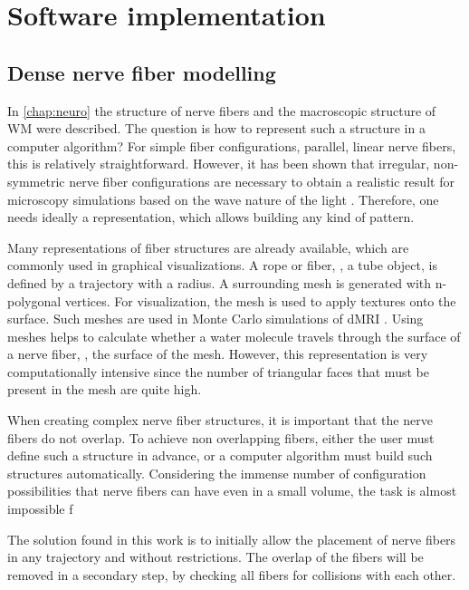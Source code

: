 \newpage\null\thispagestyle{empty}\newpage
\clearpage{\thispagestyle{empty}\cleardoublepage}
\part{Software implementation}
\parttoc
% 
% 
% 
\setcounter{chapter}{4}
\chapter{Dense nerve fiber modelling}
\label{chap:sof:modelling}
% 
In \cref{chap:neuro} the structure of nerve fibers and the macroscopic structure of \ac{WM} were described.
The question is how to represent such a structure in a computer algorithm?
For simple fiber configurations, \eg{} parallel, linear nerve fibers, this is relatively straightforward.
However, it has been shown that irregular, non-symmetric nerve fiber configurations are necessary to obtain a realistic result for microscopy simulations based on the wave nature of the light \cite{MenzelDissertation}.
Therefore, one needs ideally a representation, which allows building any kind of pattern.
\par
%
Many representations of fiber structures are already available, which are commonly used in graphical visualizations.
A rope or fiber, \ie{}, a tube object, is defined by a trajectory with a radius.
A surrounding mesh is generated with n-polygonal vertices.
For visualization, the mesh is used to apply textures onto the surface.
Such meshes are \eg{} used in Monte Carlo simulations of \ac{dMRI} \cite{Ginsburger2019,ginsburgerDis2019}.
Using meshes helps to calculate whether a water molecule travels through the surface of a nerve fiber, \ie{}, the surface of the mesh.
However, this representation is very computationally intensive since the number of triangular faces that must be present in the mesh are quite high.
\par
%
When creating complex nerve fiber structures, it is important that the nerve fibers do not overlap.
To achieve non overlapping fibers, either the user must define such a structure in advance, or a computer algorithm must build such structures automatically.
Considering the immense number of configuration possibilities that nerve fibers can have even in a small volume, the task is almost impossible f
\par
%
The solution found in this work is to initially allow the placement of nerve fibers in any trajectory and without restrictions.
The overlap of the fibers will be removed in a secondary step, by checking all fibers for collisions with each other.
